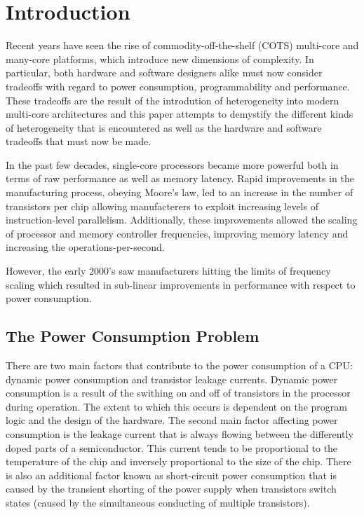 \section{Introduction}

Recent years have seen the rise of commodity-off-the-shelf (COTS) multi-core and many-core platforms, which introduce new dimensions of complexity. In particular, both hardware and software designers alike must now consider tradeoffs with regard to power consumption, programmability and performance. These tradeoffs are the result of the introdution of heterogeneity into modern multi-core architectures and this paper attempts to demystify the different kinds of heterogeneity that is encountered as well as the hardware and software tradeoffs that must now be made.

In the past few decades, single-core processors became more powerful both in terms of raw performance as well as memory latency. Rapid improvements in the  manufacturing process, obeying Moore's law, led to an increase in the number of transistors per chip allowing manufacterers to exploit increasing levels of instruction-level parallelism. Additionally, these improvements allowed the scaling of processor and memory controller frequencies, improving memory latency and increasing the operations-per-second.

However, the early 2000's saw manufacturers hitting the limits of frequency scaling which resulted in sub-linear improvements in performance with respect to power consumption.

\subsection{The Power Consumption Problem}

There are two main factors that contribute to the power consumption of a CPU: dynamic power consumption and transistor leakage currents. Dynamic power consumption is a result of the swithing on and off of transistors in the processor during operation. The extent to which this occurs is dependent on the program logic and the design of the hardware. The second main factor affecting power consumption is the leakage current that is always flowing between the differently doped parts of a semiconductor. This current tends to be proportional to the temperature of the chip and inversely proportional to the size of the chip. There is also an additional factor known as short-circuit power consumption that is caused by the transient shorting of the power supply when transistors switch states (caused by the simultaneous conducting of multiple transistors). \cite{ftp://download.intel.com/design/network/papers/30117401.pdf}


